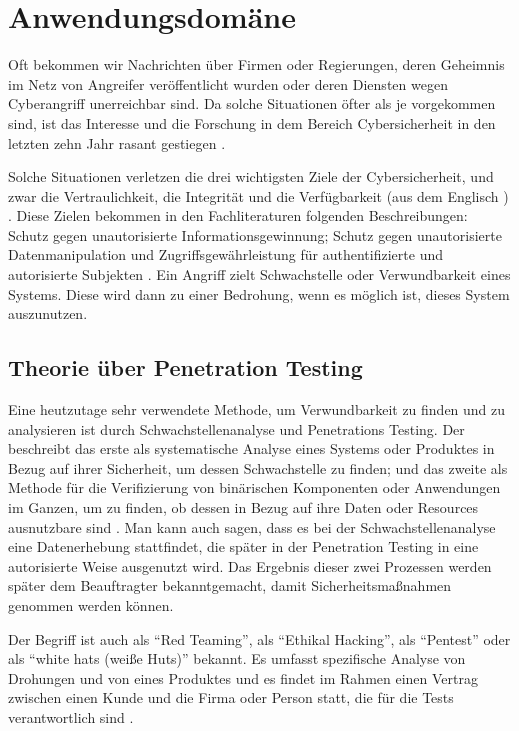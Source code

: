 \section{Anwendungsdomäne}

Oft bekommen wir Nachrichten über Firmen oder Regierungen, deren Geheimnis im Netz von Angreifer veröffentlicht wurden oder deren Diensten wegen \gls{Cyberangriff} unerreichbar sind. Da solche Situationen öfter als je vorgekommen sind, ist das Interesse und die Forschung in dem Bereich \gls{Cybersicherheit} in den letzten zehn Jahr rasant gestiegen \cite{opvenvpn}. 

Solche Situationen verletzen die drei wichtigsten Ziele der \gls{Cybersicherheit}, und zwar die Vertraulichkeit, die Integrität und die Verfügbarkeit (aus dem Englisch ) . Diese Zielen bekommen in den Fachliteraturen folgenden Beschreibungen: Schutz gegen unautorisierte Informationsgewinnung; Schutz gegen unautorisierte Datenmanipulation und Zugriffsgewährleistung für authentifizierte und autorisierte Subjekten \cite{Wendzel_It-Sicherheit}. Ein Angriff zielt \gls{Schwachstelle} oder \gls{Verwundbarkeit} eines Systems. Diese wird dann zu einer Bedrohung, wenn es möglich ist, dieses System auszunutzen.

\subsection{Theorie über Penetration Testing}

Eine heutzutage sehr verwendete Methode, um \gls{Verwundbarkeit} zu finden und zu analysieren ist durch Schwachstellenanalyse und Penetrations Testing. Der  beschreibt das erste als systematische Analyse eines Systems oder Produktes in Bezug auf ihrer Sicherheit, um dessen \gls{Schwachstelle} zu finden; und das zweite als Methode für die Verifizierung von binärischen Komponenten oder Anwendungen im Ganzen, um zu finden, ob dessen  in Bezug auf ihre Daten oder Resources ausnutzbare sind \cite{NIST_Definitionen}. Man kann auch sagen, dass es bei der Schwachstellenanalyse eine Datenerhebung stattfindet, die später in der Penetration Testing in eine autorisierte Weise ausgenutzt wird\cite{Goel_VulAsses_PenTest}. Das Ergebnis dieser zwei Prozessen werden später dem Beauftragter bekanntgemacht, damit Sicherheitsmaßnahmen genommen werden können.

Der Begriff ist auch als ``Red Teaming'', als ``Ethikal Hacking'', als ``Pentest'' oder als ``white hats (weiße Huts)'' bekannt. Es umfasst spezifische Analyse von Drohungen und von  eines Produktes und es findet im Rahmen einen Vertrag zwischen einen Kunde und die Firma oder Person statt, die für die Tests verantwortlich sind \cite{Bishop_PenTest}.

